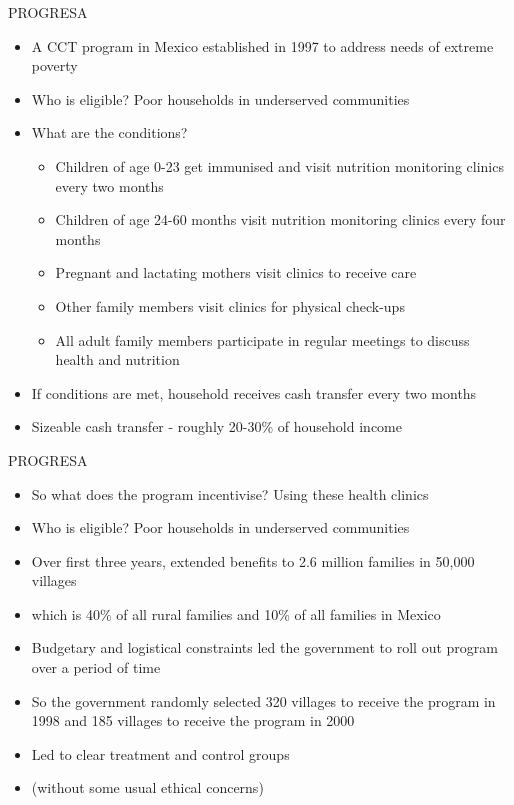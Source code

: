 \documentclass[11pt,notes=hide,aspectratio=169,mathserif]{beamer}
\begin{document}
\begin{frame}{PROGRESA}
\begin{itemize}
\item A CCT program in Mexico established in 1997 to address needs of extreme poverty
\item Who is eligible? Poor households in underserved communities
\item What are the conditions?
\begin{itemize}
\item Children of age 0-23 get immunised and visit nutrition monitoring clinics every two months 
\item Children of age 24-60 months visit nutrition monitoring clinics every four months 
\item Pregnant and lactating mothers visit clinics to receive care 
\item Other family members visit clinics for physical check-ups
\item All adult family members participate in regular meetings to discuss health and nutrition
\end{itemize}
\item If conditions are met, household receives cash transfer every two months
\item Sizeable cash transfer - roughly 20-30\% of household income
\end{itemize}
\end{frame}

\begin{frame}{PROGRESA}
\begin{itemize}
\item So what does the program incentivise? Using these health clinics
\item Who is eligible? Poor households in underserved communities
\item Over first three years, extended benefits to 2.6 million families in 50,000 villages 
\item which is 40\% of all rural families and 10\% of all families in Mexico 
\item Budgetary and logistical constraints led the government to roll out program over a period of time 
\item So the government randomly selected 320 villages to receive the program in 1998 and 185 villages to receive the program in 2000 
\item Led to clear treatment and control groups 
\item (without some usual ethical concerns)
\end{itemize}
\end{frame}
\end{document}
